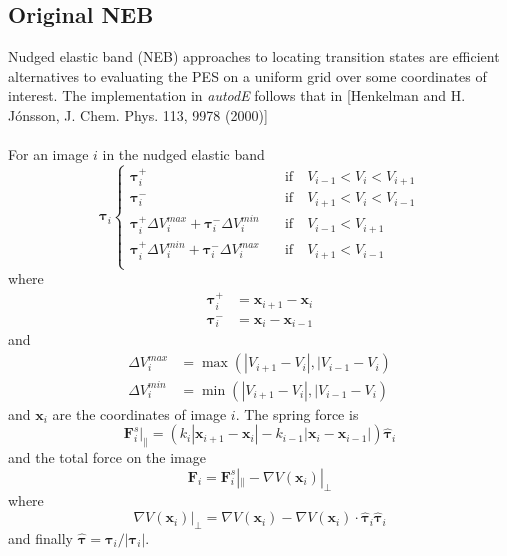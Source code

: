 \documentclass[10pt]{article}
\begin{document}
\subsection{Original NEB}

Nudged elastic band (NEB) approaches to locating transition states are efficient alternatives to evaluating the PES on a uniform grid over some coordinates of interest. The implementation in \emph{autodE} follows that in [Henkelman and H. Jónsson, J. Chem. Phys. 113, 9978 (2000)]
\\\\
For an image $i$ in the nudged elastic band
\begin{equation}
\boldsymbol{\tau}_i
\begin{cases}
\boldsymbol{\tau}_i^+ &\quad\text{if}\quad V_{i-1} < V_i < V_{i+1} \\
\boldsymbol{\tau}_i^- &\quad\text{if}\quad V_{i+1} < V_i < V_{i-1} \\
\boldsymbol{\tau}_i^+\Delta V_i^{max} + \boldsymbol{\tau}_i^-\Delta V_i^{min} &\quad\text{if}\quad V_{i-1} <  V_{i+1} \\
\boldsymbol{\tau}_i^+\Delta V_i^{min} + \boldsymbol{\tau}_i^-\Delta V_i^{max} &\quad\text{if}\quad V_{i+1} < V_{i-1} \\
\end{cases}
\end{equation}
where
\begin{equation}
\begin{aligned}
\boldsymbol{\tau}_i^+ &= \boldsymbol{x}_{i+1} - \boldsymbol{x}_i \\
\boldsymbol{\tau}_i^- &= \boldsymbol{x}_{i} - \boldsymbol{x}_{i-1}
\end{aligned}
\end{equation}
and
\begin{equation}
\begin{aligned}
\Delta V_i^{max} &= \max(|V_{i+1} - V_i|, |V_{i-1} - V_i) \\
\Delta V_i^{min} &= \min(|V_{i+1} - V_i|, |V_{i-1} - V_i)
\end{aligned}
\end{equation}
and $\boldsymbol{x}_i$ are the coordinates of image $i$. The spring force is
\begin{equation}
\boldsymbol{F}^s_i|_{\parallel} = (k_i|\boldsymbol{x}_{i+1} - \boldsymbol{x}_i| - k_{i-1}|\boldsymbol{x}_i - \boldsymbol{x}_{i-1}|) \hat{\boldsymbol{\tau}}_i
\end{equation}
and the total force on the image
\begin{equation}
\boldsymbol{F}_i = \boldsymbol{F}^s_i|_{\parallel} - \nabla V(\boldsymbol{x}_i)|_\perp
\end{equation}
where
\begin{equation}
\nabla V(\boldsymbol{x}_i)|_\perp = \nabla V(\boldsymbol{x}_i) - \nabla V(\boldsymbol{x}_i)\cdot \hat{\boldsymbol{\tau}}_i\hat{\boldsymbol{\tau}}_i
\end{equation}
and finally $\hat{\boldsymbol{\tau}} = \boldsymbol{\tau}_i/|\boldsymbol{\tau}_i|$.
\\\\
\end{document}
